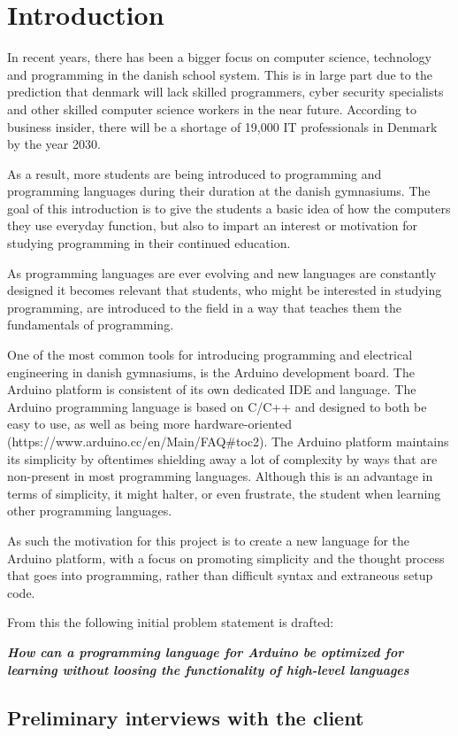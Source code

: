 
\chapter{Introduction}

In recent years, there has been a bigger focus on computer science, technology and programming in the danish school system.
This is in large part due to the prediction that denmark will lack skilled programmers, cyber security specialists and other skilled computer science workers in the near future.
According to business insider, there will be a shortage of 19,000 IT professionals in Denmark by the year 2030.\cite{ITLackDK}

As a result, more students are being introduced to programming and programming languages during their duration at the
danish gymnasiums. 
The goal of this introduction is to give the students a basic idea of how the computers they use everyday function, but also to impart an interest or motivation for studying programming in their continued education.

As programming languages are ever evolving and new languages are constantly designed it becomes relevant
that students, who might be interested in studying programming, are introduced to the field in a way that
teaches them the fundamentals of programming.

One of the most common tools for introducing programming and electrical engineering in danish gymnasiums, is
the Arduino development board. The Arduino platform is consistent of its own dedicated IDE and language.
The Arduino programming language is based on C/C++ and designed to both be easy to use, as well as being
more hardware-oriented (https://www.arduino.cc/en/Main/FAQ\#toc2).
The Arduino platform maintains its simplicity by oftentimes shielding away a lot of complexity by ways
that are non-present in most programming languages.
Although this is an advantage in terms of simplicity, it might halter, or even frustrate, the student when learning other programming
languages.

As such the motivation for this project is to create a new language for the Arduino platform, with a focus on promoting simplicity and the thought process that goes into programming, rather than difficult syntax and extraneous setup code.


From this the following initial problem statement is drafted:

\centering\textit{\textbf{How can a programming language for Arduino be optimized for learning without 
loosing the functionality of high-level languages}}
\section{Preliminary interviews with the client}
